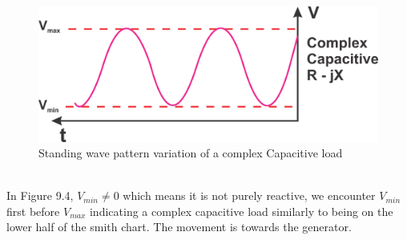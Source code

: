 \begin{figure}[h!]
\centering
\includegraphics[scale=0.5]{./graphics/Group94}
\caption{Standing wave pattern variation of a complex Capacitive load}
\end{figure}\\In Figure 9.4, $V_{min}\neq0$ which means it is not purely reactive, we encounter $V_{min}$ first before $V_{max}$ indicating a complex capacitive load similarly to being on the lower half of the smith chart. The movement is towards the generator.\\

